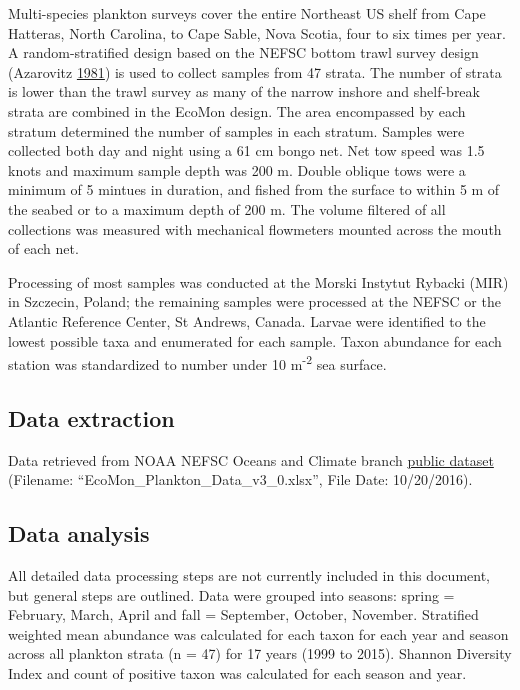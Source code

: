 \documentclass[
]{book}
\begin{document}
Multi-species plankton surveys cover the entire Northeast US shelf from Cape Hatteras, North Carolina, to Cape Sable, Nova Scotia, four to six times per year. A random-stratified design based on the NEFSC bottom trawl survey design (Azarovitz \protect\hyperlink{ref-Azarovitz1981}{1981}) is used to collect samples from 47 strata. The number of strata is lower than the trawl survey as many of the narrow inshore and shelf-break strata are combined in the EcoMon design.
The area encompassed by each stratum determined the number of samples in each stratum. Samples were collected both day and night using a 61 cm bongo net. Net tow speed was 1.5 knots and maximum sample depth was 200 m. Double oblique tows were a minimum of 5 mintues in duration, and fished from the surface to within 5 m of the seabed or to a maximum depth of 200 m. The volume filtered of all collections was measured with mechanical flowmeters mounted across the mouth of each net.

Processing of most samples was conducted at the Morski Instytut Rybacki (MIR) in Szczecin, Poland; the remaining samples were processed at the NEFSC or the Atlantic Reference Center, St Andrews, Canada. Larvae were identified to the lowest possible taxa and enumerated for each sample. Taxon abundance for each station was standardized to number under 10 m\textsuperscript{-2} sea surface.

\hypertarget{data-extraction-16}{%
\subsection{Data extraction}\label{data-extraction-16}}

Data retrieved from NOAA NEFSC Oceans and Climate branch \href{ftp://ftp.nefsc.noaa.gov/pub/hydro/zooplankton_data/}{public dataset}
(Filename: ``EcoMon\_Plankton\_Data\_v3\_0.xlsx'', File Date: 10/20/2016).

\hypertarget{data-analysis-17}{%
\subsection{Data analysis}\label{data-analysis-17}}

All detailed data processing steps are not currently included in this document, but general steps are outlined. Data were grouped into seasons: spring = February, March, April and fall = September, October, November. Stratified weighted mean abundance was calculated for each taxon for each year and season across all plankton strata (n = 47) for 17 years (1999 to 2015). Shannon Diversity Index and count of positive taxon was calculated for each season and year.
\end{document}

